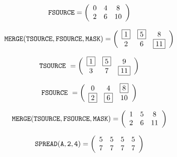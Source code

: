 \documentclass{article}
\begin{document}
{\newpage
\clearpage
\samepage \begin{displaymath}{\tt FSOURCE} =
\left(
\begin{array}{ccc}
0 & 4 & 8 \\  
2 & 6 & 10
\end{array}
\right)
\end{displaymath}
}

{\newpage
\clearpage
\samepage \begin{displaymath}{\tt MERGE}{}{\tt (}{}{\tt TSOURCE},{\tt FSOURCE},{\tt MASK}{}{\tt )} =
\left(
\begin{array}{ccc}
\fbox{1} & \fbox{5} &  8 \\  
2 & 6 & \fbox{11}
\end{array}
\right)
\end{displaymath}
}

{\newpage
\clearpage
\samepage \begin{displaymath}{\tt TSOURCE}\ = 
\left(
\begin{array}{ccc}
\fbox{1} & \fbox{5} & 9 \\  
3 & 7 & \fbox{11}
\end{array}
\right)
\end{displaymath}
}

{\newpage
\clearpage
\samepage \begin{displaymath}{\tt FSOURCE}\ =
\left(
\begin{array}{ccc}
0 &  4 &  \fbox{8} \\  
\fbox{2} &  \fbox{6} &  10
\end{array}
\right)
\end{displaymath}
}

{\newpage
\clearpage
\samepage \begin{displaymath}{\tt MERGE}{}{\tt (}{}{\tt TSOURCE},{\tt FSOURCE},{\tt MASK}{}{\tt )} =
\left(
\begin{array}{ccc}
1 & 5 &  8 \\  
2 & 6 & 11
\end{array}
\right)
\end{displaymath}
}

{\newpage
\clearpage
\samepage \begin{displaymath}{\tt SPREAD}{\tt (A,2,4)} = 
\left(
\begin{array}{rrrr}
5 &  5 &  5 &  5 \\  
7 &  7 &  7 &  7
\end{array}
\right)
\end{displaymath}
}
\end{document}
